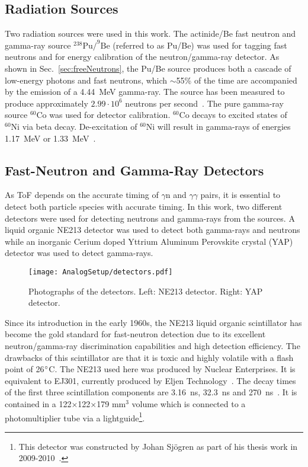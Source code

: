 \documentclass[main.tex]{subfiles}
\begin{document}
\subsection{Radiation Sources}
Two radiation sources were used in this work. The actinide/Be fast neutron and gamma-ray source $^\text{238}\text{Pu}/^\text{9}\text{Be}$ (referred to as Pu/Be) was used for tagging fast neutrons and for energy calibration of the neutron/gamma-ray detector. As shown in Sec.~\ref{sec:freeNeutrons}, the Pu/Be source produces both a cascade of low-energy photons and fast neutrons, which $\sim$55\% of the time are accompanied by the emission of a \SI{4.44}{\MeV} gamma-ray. The source has been measured to produce approximately $\text{2.99}\cdot\text{10}^\text{6}$ neutrons per second~\cite{Scherzinger:2017}. The pure gamma-ray source $^\text{60}\text{Co}$ was used for detector calibration. $^\text{60}\text{Co}$ decays to excited states of $^\text{60}\text{Ni}$ via beta decay. De-excitation of $^\text{60}\text{Ni}$ will result in gamma-rays of energies \SI{1.17}{MeV} or \SI{1.33}{MeV}~\cite{Nudat}.



\subsection{Fast-Neutron and Gamma-Ray Detectors}
As ToF depends on the accurate timing of $\gamma$n and $\gamma\gamma$ pairs, it is essential to detect both particle species with accurate timing. In this work, two different detectors were used for detecting neutrons and gamma-rays from the sources. A liquid organic NE213 detector was used to detect both gamma-rays and neutrons while an inorganic Cerium doped Yttrium Aluminum Perovskite crystal (YAP) detector was used to detect gamma-rays. 

\begin{figure}[h]
    \centering
        \texttt{[image: AnalogSetup/detectors.pdf]}
        \caption[Photographs of the detectors.]{Photographs of the detectors. Left: NE213 detector. Right: YAP detector.}
    \label{fig:detectors}
\end{figure}

Since its introduction in the early 1960s, the NE213 liquid organic scintillator has become the gold standard for fast-neutron detection due to its excellent neutron/gamma-ray discrimination capabilities and high detection efficiency. 
The drawbacks of this scintillator are that it is toxic and highly volatile with a flash point of 26$\text{\degree}$C. The NE213 used here was produced by Nuclear Enterprises. It is equivalent to EJ301, currently produced by Eljen Technology~\cite{Eljen}. The decay times of the first three scintillation components are \SI{3.16}{ns}, \SI{32.3}{ns} and \SI{270}{ns}~\cite{Eljen}. It is contained in a 122$\times$122$\times$179 \si{\mm}$^\text{3}$ volume which is connected to a photomultiplier tube via a lightguide\footnote{This detector was constructed by Johan Sjögren as part of his thesis work in 2009-2010~\cite{sjogren}.}.
\end{document}
